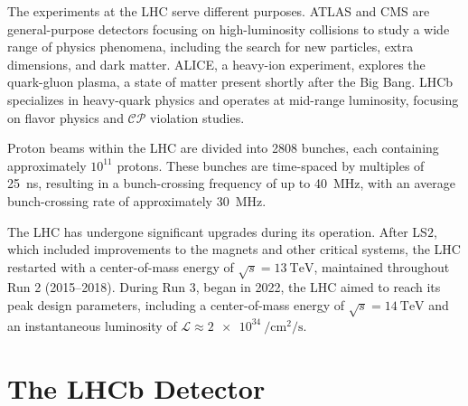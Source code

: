 The experiments at the LHC serve different purposes. ATLAS and CMS are general-purpose detectors focusing on high-luminosity collisions to study a wide range of physics phenomena, including the search for new particles, extra dimensions, and dark matter. ALICE, a heavy-ion experiment, explores the quark-gluon plasma, a state of matter present shortly after the Big Bang. LHCb specializes in heavy-quark physics and operates at mid-range luminosity, focusing on flavor physics and $\mathcal{CP}$ violation studies.

Proton beams within the LHC are divided into 2808 bunches, each containing approximately $10^{11}$ protons. These bunches are time-spaced by multiples of \SI{25}{\nano\second}, resulting in a bunch-crossing frequency of up to \SI{40}{\mega\hertz}, with an average bunch-crossing rate of approximately \SI{30}{\mega\hertz}. 

The LHC has undergone significant upgrades during its operation. After LS$2$, which included improvements to the magnets and other critical systems, the LHC restarted with a center-of-mass energy of $\sqrt{s}=\SI{13}{\tera\eV}$, maintained throughout Run 2 (2015–2018). During Run 3, began in 2022, the LHC aimed to reach its peak design parameters, including a center-of-mass energy of $\sqrt{s}=\SI{14}{\tera\eV}$ and an instantaneous luminosity of $\mathcal{L}\approx\SI{2e34}{\per\centi\meter\squared\per\second}$.


\section{The LHCb Detector}

